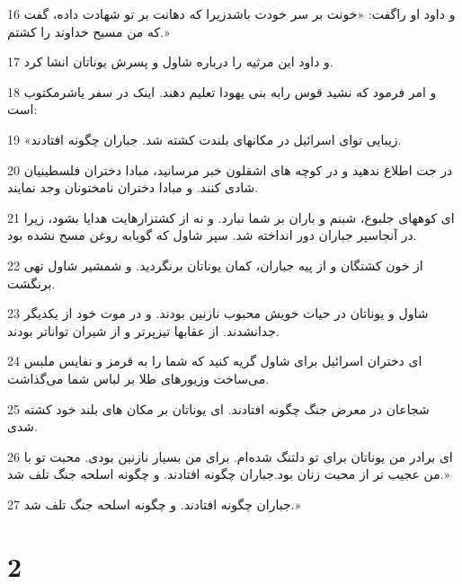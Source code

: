\par 16 و داود او راگفت: «خونت بر سر خودت باشدزیرا که دهانت بر تو شهادت داده، گفت که من مسیح خداوند را کشتم.»
\par 17 و داود این مرثیه را درباره شاول و پسرش یوناتان انشا کرد.
\par 18 و امر فرمود که نشید قوس رابه بنی یهودا تعلیم دهند. اینک در سفر یاشرمکتوب است:
\par 19 «زیبایی تو‌ای اسرائیل در مکانهای بلندت کشته شد. جباران چگونه افتادند.
\par 20 در جت اطلاع ندهید و در کوچه های اشقلون خبر مرسانید، مبادا دختران فلسطینیان شادی کنند. و مبادا دختران نامختونان وجد نمایند.
\par 21 ‌ای کوههای جلبوع، شبنم و باران بر شما نبارد. و نه از کشتزارهایت هدایا بشود، زیرا در آنجاسپر جباران دور انداخته شد. سپر شاول که گویابه روغن مسح نشده بود.
\par 22 از خون کشتگان و از پیه جباران، کمان یوناتان برنگردید. و شمشیر شاول تهی برنگشت.
\par 23 شاول و یوناتان در حیات خویش محبوب نازنین بودند. و در موت خود از یکدیگر جدانشدند. از عقابها تیزپرتر و از شیران تواناتر بودند.
\par 24 ‌ای دختران اسرائیل برای شاول گریه کنید که شما را به قرمز و نفایس ملبس می‌ساخت وزیورهای طلا بر لباس شما می‌گذاشت.
\par 25 شجاعان در معرض جنگ چگونه افتادند. ای یوناتان بر مکان های بلند خود کشته شدی.
\par 26 ‌ای برادر من یوناتان برای تو دلتنگ شده‌ام. برای من بسیار نازنین بودی. محبت تو با من عجیب تر از محبت زنان بود.جباران چگونه افتادند. و چگونه اسلحه جنگ تلف شد.»
\par 27 جباران چگونه افتادند. و چگونه اسلحه جنگ تلف شد.»
 
\chapter{2}

